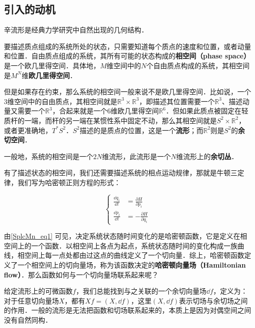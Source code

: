 

\subsection{引入的动机}

辛流形是经典力学研究中自然出现的几何结构．

要描述质点组成的系统所处的状态，只需要知道每个质点的速度和位置，或者动量和位置．自由质点组成的系统，其所有可能的状态构成的\textbf{相空间（phase space）}是一个欧几里得空间．具体地，$M$维空间中的$N$个自由质点构成的系统，其相空间是$M^N$维\textbf{欧几里得空间}．

但是如果存在约束，那么系统的相空间一般来说不是欧几里得空间．比如说，一个$3$维空间中的自由质点，其相空间就是$\mathbb{R}^3\times \mathbb{R}^3$，即描述其位置需要一个$\mathbb{R}^3$、描述动量又需要一个$\mathbb{R}^3$，合起来就是一个$6$维欧几里得空间$\mathbb{R}^6$．但如果此质点被固定在轻质杆的一端，而杆的另一端在某惯性系中固定不动，那么其相空间就是$S^2\times \mathbb{R}^2$，或者更准确地，$T^* S^2$．$S^2$描述的是质点的位置，这是一个\textbf{流形}；而$\mathbb{R}^2$则是$S^2$的\textbf{余切空间}．

一般地，系统的相空间是一个$2N$维流形，此流形是一个$N$维流形上的\textbf{余切丛}．

有了描述状态的相空间，我们还需要描述系统的相点运动规律，那就是牛顿三定律，我们写为哈密顿正则方程的形式：

\begin{equation}\label{SplcMn_eq1}
\left\{
\begin{aligned}
\frac{\dd q_i}{\dd t} &= \frac{\partial H}{\partial p_i}\\
\frac{\dd p_i}{\dd t} &= -\frac{\partial H}{\partial q_i}
\end{aligned}
\right. 
\end{equation}

由\autoref{SplcMn_eq1} 可见，决定系统状态随时间变化的是哈密顿函数，它是定义在相空间上的一个函数．以相空间上各点为起点，系统状态随时间的变化构成一族曲线，相空间上每一点处都由过这点的曲线定义了一个切向量．综上，哈密顿函数定义了一个相空间上的切向量场，称为该函数决定的\textbf{哈密顿向量场（Hamiltonian flow）}．那么函数如何与一个切向量场联系起来呢？

给定流形上的可微函数$f$，我们总能找到与之关联的一个余切向量场$\dd f$，定义为：对于任意切向量场$X$，都有$Xf = (X, \dd f)$，这里$(X, \dd f)$表示切场与余切场之间的作用．一般的流形是无法把函数和切场联系起来的，本质上是因为对偶空间之间没有自然同构．

